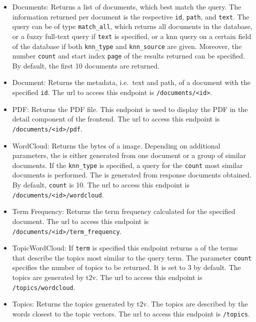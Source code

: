 \begin{itemize}
    \item \label{pt:docs}Documents: 
        Returns a list of documents, which best match the query.
        The information returned per document is the respective \texttt{id}, \texttt{path}, and \texttt{text}.
        The query can be of type \texttt{match\_all}, which returns all documents in the database, 
        or a fuzzy full-text query if \texttt{text} is specified, 
        or a \ac{knn} query on a certain field of the database if both \texttt{knn\_type} and \texttt{knn\_source} are given.
        Moreover, the number \texttt{count} and start index \texttt{page} of the results returned can be specified.
        By default, the first 10 documents are returned.

    \item \label{pt:doc}Document: 
        Returns the metadata, i.e.\ text and path, of a document with the specified \texttt{id}.
        The \ac{url} to access this endpoint is \texttt{/documents/<id>}.

    \item \label{pt:pdf}PDF: 
        Returns the PDF file.
        This endpoint is used to display the PDF in the detail component of the frontend.
        The \ac{url} to access this endpoint is \texttt{/documents/<id>/pdf}.
    
    \item \label{pt:wordcloud}WordCloud: 
        Returns the bytes of a \wordcloud{} image. 
        Depending on additional parameters, the \wordcloud{} is either generated from one document or 
        a group of similar documents.
        If the \texttt{knn\_type} is specified, a query for the \texttt{count} most similar documents is performed.
        The \wordcloud{} is generated from response documents obtained.
        By default, \texttt{count} is 10.
        The \ac{url} to access this endpoint is \texttt{/documents/<id>/wordcloud}.

    \item \label{pt:termfrequency}Term Frequency:
        Returns the term frequency calculated for the specified document.
        The \ac{url} to access this endpoint is \texttt{/documents/<id>/term\_frequency}.
        
    \item \label{pt:topic_wordcloud}TopicWordCloud:
        If \texttt{term} is specified this endpoint returns a \wordcloud{} of the terms that describe the topics most similar to the query term.
        The parameter \texttt{count} specifies the number of topics to be returned.
        It is set to 3 by default.
        The topics are generated by \ac{t2v}.
        The \ac{url} to access this endpoint is \texttt{/topics/wordcloud}.

    \item \label{pt:topic}Topics: 
        Returns the topics generated by \ac{t2v}. 
        The topics are described by the words closest to the topic vectors.
        The \ac{url} to access this endpoint is \texttt{/topics}.
\end{itemize}


